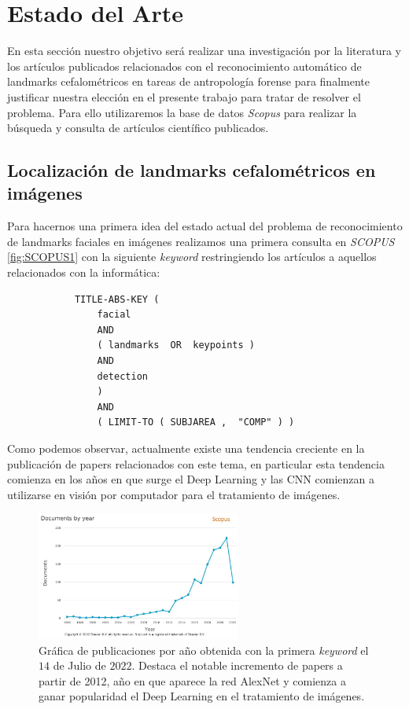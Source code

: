 
\chapter{Estado del Arte}

    \noindent En esta sección nuestro objetivo será realizar una investigación por la literatura y los artículos publicados relacionados con el reconocimiento automático de landmarks cefalométricos en tareas de antropología forense para finalmente justificar nuestra elección en el presente trabajo para tratar de resolver el problema. Para ello utilizaremos la base de datos \textit{Scopus} para realizar la búsqueda y consulta de artículos científico publicados.

    \section{Localización de landmarks cefalométricos en imágenes}

        \noindent Para hacernos una primera idea del estado actual del problema de reconocimiento de landmarks faciales en imágenes realizamos una primera consulta en \textit{SCOPUS} \autoref{fig:SCOPUS1} con la siguiente \textit{keyword} restringiendo los artículos a aquellos relacionados con la informática:
        
        \begin{verbatim}
            TITLE-ABS-KEY ( 
                facial  
                AND  
                ( landmarks  OR  keypoints )  
                AND  
                detection 
                )  
                AND  
                ( LIMIT-TO ( SUBJAREA ,  "COMP" ) )
        \end{verbatim}
        
        \medskip
        
        \noindent Como podemos observar, actualmente existe una tendencia creciente en la publicación de papers relacionados con este tema, en particular esta tendencia comienza en los años en que surge el Deep Learning y las CNN comienzan a utilizarse en visión por computador para el tratamiento de imágenes. 

        \begin{figure}[htpb]
            \centering
            \includegraphics[width=0.6\textwidth]{img/Scopus_1.jpg}
            \caption{Gráfica de publicaciones por año obtenida con la primera \textit{keyword} el $14$ de Julio de $2022$. Destaca el notable incremento de papers a partir de 2012, año en que aparece la red AlexNet y comienza a ganar popularidad el Deep Learning en el tratamiento de imágenes.}
            \label{fig:SCOPUS1}
        \end{figure}

